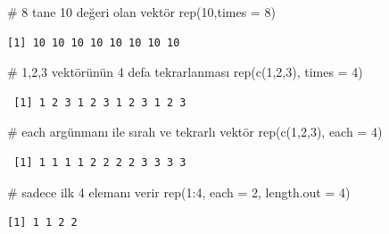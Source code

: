 \documentclass[
  letterpaper,
  DIV=11,
  numbers=noendperiod]{scrreprt}
\newenvironment{Shaded}{\begin{snugshade}}{\end{snugshade}}
\newcommand{\AttributeTok}[1]{\textcolor[rgb]{0.40,0.45,0.13}{#1}}
\newcommand{\CommentTok}[1]{\textcolor[rgb]{0.37,0.37,0.37}{#1}}
\newcommand{\DecValTok}[1]{\textcolor[rgb]{0.68,0.00,0.00}{#1}}
\newcommand{\FunctionTok}[1]{\textcolor[rgb]{0.28,0.35,0.67}{#1}}
\newcommand{\NormalTok}[1]{\textcolor[rgb]{0.00,0.23,0.31}{#1}}
\newcommand{\SpecialCharTok}[1]{\textcolor[rgb]{0.37,0.37,0.37}{#1}}
\begin{document}
\begin{Shaded}
\begin{Highlighting}[]
\CommentTok{\# 8 tane 10 değeri olan vektör}
\FunctionTok{rep}\NormalTok{(}\DecValTok{10}\NormalTok{,}\AttributeTok{times =} \DecValTok{8}\NormalTok{) }
\end{Highlighting}
\end{Shaded}

\begin{verbatim}
[1] 10 10 10 10 10 10 10 10
\end{verbatim}

\begin{Shaded}
\begin{Highlighting}[]
\CommentTok{\# 1,2,3 vektörünün 4 defa tekrarlanması}
\FunctionTok{rep}\NormalTok{(}\FunctionTok{c}\NormalTok{(}\DecValTok{1}\NormalTok{,}\DecValTok{2}\NormalTok{,}\DecValTok{3}\NormalTok{), }\AttributeTok{times =} \DecValTok{4}\NormalTok{) }
\end{Highlighting}
\end{Shaded}

\begin{verbatim}
 [1] 1 2 3 1 2 3 1 2 3 1 2 3
\end{verbatim}

\begin{Shaded}
\begin{Highlighting}[]
\CommentTok{\# each argünmanı ile sıralı ve tekrarlı vektör}
\FunctionTok{rep}\NormalTok{(}\FunctionTok{c}\NormalTok{(}\DecValTok{1}\NormalTok{,}\DecValTok{2}\NormalTok{,}\DecValTok{3}\NormalTok{), }\AttributeTok{each =} \DecValTok{4}\NormalTok{)}
\end{Highlighting}
\end{Shaded}

\begin{verbatim}
 [1] 1 1 1 1 2 2 2 2 3 3 3 3
\end{verbatim}

\begin{Shaded}
\begin{Highlighting}[]
\CommentTok{\# sadece ilk 4 elemanı verir}
\FunctionTok{rep}\NormalTok{(}\DecValTok{1}\SpecialCharTok{:}\DecValTok{4}\NormalTok{, }\AttributeTok{each =} \DecValTok{2}\NormalTok{, }\AttributeTok{length.out =} \DecValTok{4}\NormalTok{) }
\end{Highlighting}
\end{Shaded}

\begin{verbatim}
[1] 1 1 2 2
\end{verbatim}
\end{document}
